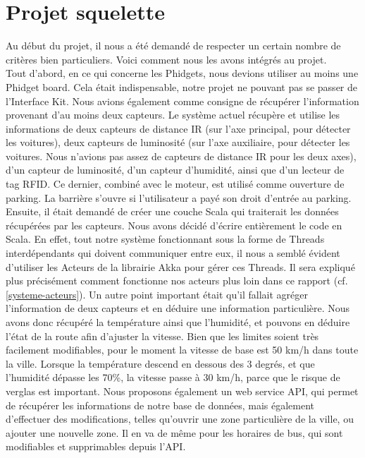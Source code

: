 \section{Projet squelette}
Au début du projet, il nous a été demandé de respecter un certain nombre de critères bien particuliers. Voici comment nous les avons intégrés au projet.\\

Tout d’abord, en ce qui concerne les Phidgets, nous devions utiliser au moins une Phidget board. Cela était indispensable, notre projet ne pouvant pas se passer de l’Interface Kit. Nous avions également comme consigne de récupérer l’information provenant d’au moins deux capteurs. Le système actuel récupère et utilise les informations de deux capteurs de distance IR (sur l’axe principal, pour détecter les voitures), deux capteurs de luminosité (sur l’axe auxiliaire, pour détecter les voitures. Nous n’avions pas assez de capteurs de distance IR pour les deux axes), d’un capteur de luminosité, d’un capteur d’humidité, ainsi que d’un lecteur de tag RFID. Ce dernier, combiné avec le moteur, est utilisé comme ouverture de parking. La barrière s’ouvre si l’utilisateur a payé son droit d’entrée au parking.\\

Ensuite, il était demandé de créer une couche Scala qui traiterait les données récupérées par les capteurs. Nous avons décidé d’écrire entièrement le code en Scala. En effet, tout notre système fonctionnant sous la forme de Threads interdépendants qui doivent communiquer entre eux, il nous a semblé évident d’utiliser les Acteurs de la librairie Akka pour gérer ces Threads. Il sera expliqué plus précisément comment fonctionne nos acteurs plus loin dans ce rapport (cf. \ref{systeme-acteurs}). Un autre point important était qu’il fallait agréger l’information de deux capteurs et en déduire une information particulière. Nous avons donc récupéré la température ainsi que l’humidité, et pouvons en déduire l’état de la route afin d’ajuster la vitesse. Bien que les limites soient très facilement modifiables, pour le moment la vitesse de base est 50 km/h dans toute la ville. Lorsque la température descend en dessous des 3 degrés, et que l’humidité dépasse les 70\%, la vitesse passe à 30 km/h, parce que le risque de verglas est important. Nous proposons également un web service API, qui permet de récupérer les informations de notre base de données, mais également d’effectuer des modifications, telles qu’ouvrir une zone particulière de la ville, ou ajouter une nouvelle zone. Il en va de même pour les horaires de bus, qui sont modifiables et supprimables depuis l’API.\\